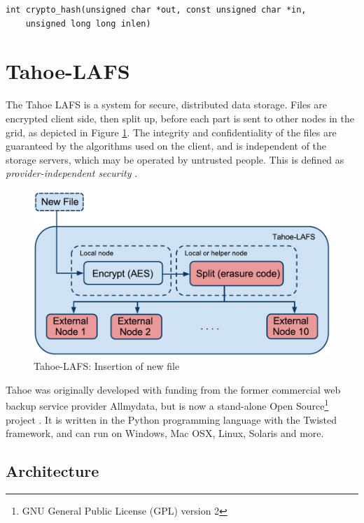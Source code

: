 \documentclass[english,12pt,a4paper]{book}
\begin{document}
\begin{verbatim}
int crypto_hash(unsigned char *out, const unsigned char *in,
    unsigned long long inlen)
\end{verbatim}

\section{Tahoe-LAFS}

The Tahoe \ac{LAFS} is a system for secure,
distributed data storage. Files are encrypted client side, then
split up, before each part is sent to other nodes in the grid, as depicted in
Figure \ref{fig:tahoeinsertion}. The integrity and confidentiality of the files
are guaranteed by the algorithms used on the client, and is independent of the
storage servers, which may be operated by untrusted people. This is defined as
\emph{provider-independent security} \cite{t_tahoe}.

\begin{figure}[h!]
    \centering
    \includegraphics[width=0.9\columnwidth]{Tahoe-newfile.pdf}
    \caption{Tahoe-LAFS: Insertion of new file}
    \label{fig:tahoeinsertion}
\end{figure}

Tahoe was originally developed with funding from the former commercial web
backup service provider Allmydata, but is now a stand-alone Open
Source\footnote{GNU General Public License (GPL) version 2} project
\cite{t_ars}.  It is written in the Python programming language with the Twisted
framework, and can run on Windows, Mac OSX, Linux, Solaris and more.

\subsection{Architecture}
\end{document}
